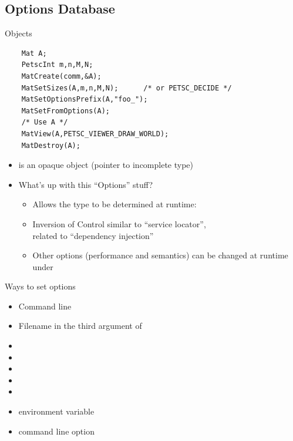 \subsection{Options Database}
\begin{frame}[fragile]{Objects}
  \begin{verbatim}
    Mat A;
    PetscInt m,n,M,N;
    MatCreate(comm,&A);
    MatSetSizes(A,m,n,M,N);      /* or PETSC_DECIDE */ 
    MatSetOptionsPrefix(A,"foo_");
    MatSetFromOptions(A);
    /* Use A */
    MatView(A,PETSC_VIEWER_DRAW_WORLD);
    MatDestroy(A);
  \end{verbatim}
  \begin{itemize}
  \item {} is an opaque object (pointer to incomplete type)
  \item What's up with this ``Options'' stuff?
    \begin{itemize}
    \item Allows the type to be determined at runtime: 
    \item Inversion of Control similar to ``service locator'', \\
      related to ``dependency injection''
    \item Other options (performance and semantics) can be changed at
      runtime under 
    \end{itemize}
  \end{itemize}
\end{frame}



\begin{frame}{Ways to set options}
  \begin{itemize}
  \item Command line
  \item Filename in the third argument of 
  \item {}
  \item {}
  \item {}
  \item {}
  \item {}
  \item {} environment variable
  \item command line option 
  \end{itemize}
\end{frame}

